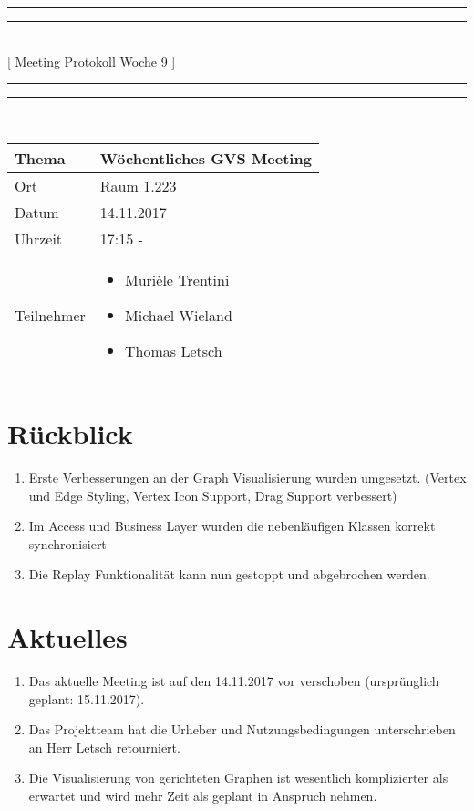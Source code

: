 \documentclass[11pt, a4paper,oneside]{scrartcl}
\begin{document}
\centering
\rule{\textwidth}{1.6pt}\vspace*{-\baselineskip}\vspace*{2pt} %
\rule{\textwidth}{0.4pt}\\[\baselineskip] %
{\LARGE [ Meeting Protokoll Woche 9 ]}\\[0.2\baselineskip] %
\rule{\textwidth}{0.4pt}\vspace*{-\baselineskip}\vspace{3.2pt} %
\rule{\textwidth}{1.6pt}\\[2\baselineskip] %

\begin{tabu} to \linewidth {l X }
	\toprule
	\textbf{Thema} & \textbf{Wöchentliches GVS Meeting} \\
	\midrule
	Ort & Raum 1.223 \\
	Datum & 14.11.2017  \\
	Uhrzeit &  17:15 -   \\
	Teilnehmer & 
	\begin{minipage}[t]{\textwidth}
	  	\begin{itemize}
			\item Murièle Trentini
			\item Michael Wieland
			\item Thomas Letsch
	  	\end{itemize}
	\end{minipage}
	\\
	\bottomrule
\end{tabu}


\section{Rückblick}
\begin{enumerate}
	\item Erste Verbesserungen an der Graph Visualisierung wurden umgesetzt. (Vertex und Edge Styling, Vertex Icon Support, Drag Support verbessert)
	\item Im Access und Business Layer wurden die nebenläufigen Klassen korrekt synchronisiert
	\item Die Replay Funktionalität kann nun gestoppt und abgebrochen werden.
\end{enumerate}

\section{Aktuelles}
\begin{enumerate}
	\item Das aktuelle Meeting ist auf den 14.11.2017 vor verschoben (ursprünglich geplant: 15.11.2017).
	\item Das Projektteam hat die Urheber und Nutzungsbedingungen unterschrieben an Herr Letsch retourniert.
	\item Die Visualisierung von gerichteten Graphen ist wesentlich komplizierter als erwartet und wird mehr Zeit als geplant in Anspruch nehmen.
\end{enumerate}
\end{document}
